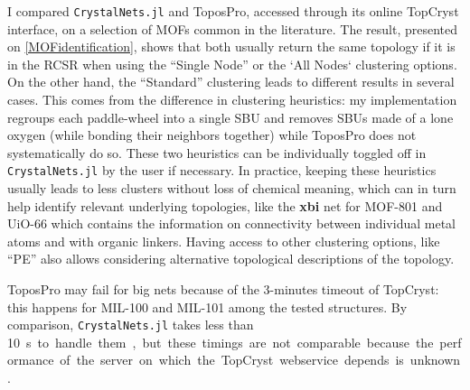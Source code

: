 \documentclass[main.tex]{subfiles}
\begin{document}
I compared \texttt{CrystalNets.jl} and ToposPro, accessed through its online TopCryst interface, on a selection of MOFs common in the literature. The result, presented on \cref{MOFidentification}, shows that both usually return the same topology if it is in the RCSR when using the ``Single Node'' or the `All Nodes` clustering options. On the other hand, the ``Standard'' clustering leads to different results in several cases. This comes from the difference in clustering heuristics: my implementation regroups each paddle-wheel into a single SBU and removes SBUs made of a lone oxygen (while bonding their neighbors together) while ToposPro does not systematically do so. These two heuristics can be individually toggled off in \texttt{CrystalNets.jl} by the user if necessary. In practice, keeping these heuristics usually leads to less clusters without loss of chemical meaning, which can in turn help identify relevant underlying topologies, like the \textbf{xbi} net for MOF-801 and UiO-66 which contains the information on connectivity between individual metal atoms and with organic linkers. Having access to other clustering options, like ``PE'' also allows considering alternative topological descriptions of the topology.

ToposPro may fail for big nets because of the 3-minutes timeout of TopCryst: this happens for MIL-100 and MIL-101 among the tested structures. By comparison, \texttt{CrystalNets.jl} takes less than \SI{10}s to handle them, but these timings are not comparable because the performance of the server on which the TopCryst webservice depends is unknown.
\end{document}
